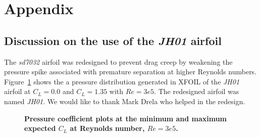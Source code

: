 \documentclass[]{aiaa-tc}%
\begin{document}
\section*{Appendix}

\subsection{Discussion on the use of the \emph{JH01} airfoil}

The \emph{sd7032} airfoil was redesigned to prevent drag creep by weakening the pressure spike associated with premature separation at higher Reynolds numbers.  
Figure~\ref{f:jhcps} shows the a pressure distribution generated in XFOIL of the \emph{JH01} airfoil at $C_L=0.0$ and $C_L=1.35$ with $Re=3e5$.
The redesigned airfoil was named \emph{JH01}. We would like to thank Mark Drela who helped in the redesign.

\begin{figure}[H]
 \begin{subfigmatrix}{2}%
 \end{subfigmatrix}
 \caption{\textbf{ Pressure coefficient plots at the minimum and maximum expected $C_L$ at Reynolds number, $Re=3e5$.  }}
 \label{f:jhcps}
\end{figure}



\end{document}
